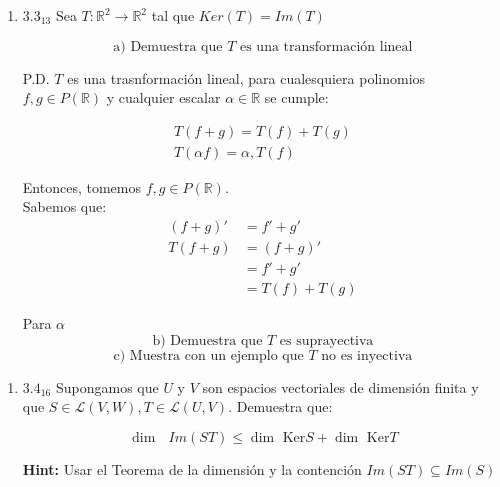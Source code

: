\documentclass{article}
\begin{document}
		\begin{enumerate}
			
			\item[] \(3.3_{13}\) Sea \(T:\mathbb{R}^2\to\mathbb{R}^2\) tal que \(Ker(T)=Im(T)\)
			
			\begin{equation*}
				\text{a) Demuestra que } T \text{ es una transformación lineal}
			\end{equation*}
			
			P.D. \(T\) es una trasnformación lineal, para cualesquiera polinomios \(f,g\in P (\mathbb{R})\) y cualquier escalar \(\alpha \in \mathbb{R}\) se cumple:
			
			\begin{equation*}
				\begin{aligned}
					T(f+g) = T(f) + T(g) \\
					T(\alpha f) = \alpha, T(f)
				\end{aligned}
			\end{equation*}
			
			Entonces, tomemos \(f,g\in P(\mathbb{R})\). \\
			Sabemos que: 
			\begin{equation*}
				\begin{aligned}
					(f+g)' &=f'+g' \\
					T(f+g) &= (f+g)' \\
						   &= f'+g' \\
					&=T(f)+T(g)
				\end{aligned}
			\end{equation*}
			
			Para $\alpha$ \\
			
			\begin{equation*}
				\text{b) Demuestra que } T \text{ es suprayectiva}
			\end{equation*}
			\begin{equation*}
				\text{c) Muestra con un ejemplo que } T \text{ no es inyectiva}
			\end{equation*}
			
		\end{enumerate}
		
		\begin{enumerate}
			
			\item[] \(3.4_{16}\) Supongamos que \(U\) y \(V\) son espacios vectoriales de dimensión finita y que \(S\in\mathscr{L}(V,W), T\in\mathscr{L}(U,V)\). Demuestra que:
			
			\begin{equation*}
				\dim\text{ }Im(ST) \leq \dim\text{ Ker}S + \dim\text{ Ker}T
			\end{equation*}
			
			\textbf{Hint:} Usar el Teorema de la dimensión y la contención \(Im(ST) \subseteq Im(S)\)
			
		\end{enumerate}
		
\end{document}
